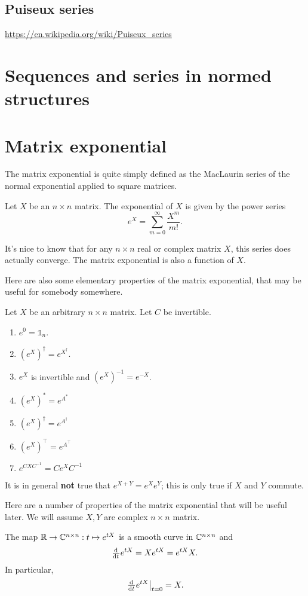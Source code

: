 \subsection{Puiseux series}
\url{https://en.wikipedia.org/wiki/Puiseux_series}

\section{Sequences and series in normed structures}

\section{Matrix exponential}
The matrix exponential is quite simply defined as the MacLaurin series of the normal exponential applied to square matrices.

\begin{definition}
Let $X$ be an $n\times n$ matrix. The exponential of $X$ is given by the power series
\[ e^X = \sum^\infty_{m=0} \frac{X^m}{m!}. \]
\end{definition}

It's nice to know that for any $n \times n$ real or complex matrix $X$, this series does actually converge. The matrix exponential is also a  function of $X$.

Here are also some elementary properties of the matrix exponential, that may be useful for somebody somewhere.
\begin{eigenschap}
Let $X$ be an arbitrary $n\times n$ matrix. Let $C$ be invertible.
\begin{enumerate}
\item $e^0 = \mathbb{1}_n$.
\item $\left(e^X\right)^\dagger = e^{X^\dagger}$.
\item $e^X$ is invertible and $\left(e^X\right)^{-1} = e^{-X}$.
\item $\left(e^X\right)^* = e^{A^*}$
\item $\left(e^X\right)^\dagger = e^{A^\dagger}$
\item $\left(e^X\right)^\intercal = e^{A^\intercal}$
\item $e^{CXC^{-1}} = Ce^XC^{-1}$
\end{enumerate}
\end{eigenschap}
It is in general \textbf{not} true that $e^{X+Y} = e^Xe^Y$; this is only true if $X$ and $Y$ commute.

Here are a number of properties of the matrix exponential that will be useful later. We will assume $X, Y$ are complex $n\times n$ matrix.
\begin{eigenschap}
The map $\mathbb{R} \to \mathbb{C}^{n\times n}: t \mapsto e^{tX}$ is a smooth curve in $\mathbb{C}^{n\times n}$ and
\[ \od{}{t}e^{tX} = Xe^{tX} = e^{tX}X. \]
In particular,
\[ \left.\od{}{t}e^{tX}\right|_{t=0} = X. \]
\end{eigenschap}


